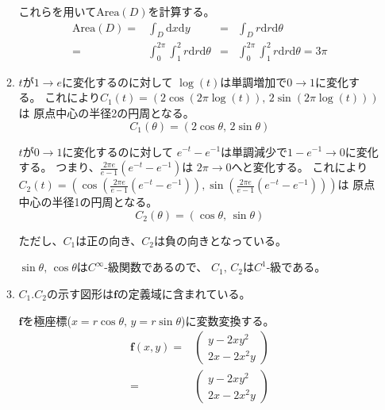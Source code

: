 \documentclass[12pt,b5paper]{ltjsarticle}
\begin{document}
\begin{enumerate}
\begin{enumerate}
            これらを用いて$\mathrm{Area}(D)$を計算する。
            \begin{align}
             \mathrm{Area}(D) =& \int_{D}\mathrm{d}x\mathrm{d}y
             &=& \int_{D}r\mathrm{d}r\mathrm{d}\theta\\
             =& \int_{0}^{2\pi}\!\!\!\int_{1}^{2} r\mathrm{d}r\mathrm{d}\theta
             &=& \int_{0}^{2\pi}\!\!\!\int_{1}^{2} r\mathrm{d}r\mathrm{d}\theta
             = 3\pi
            \end{align}


       \item
            $t$が$1 \to e$に変化するのに対して
            $\log (t)$は単調増加で$0\to 1$に変化する。
            これにより$C_1(t) = (2\cos (2\pi \log (t)) , \, 2\sin (2\pi \log (t)))$は
            原点中心の半径2の円周となる。
            \begin{equation}
             C_1(\theta) = (2\cos\theta , \, 2\sin\theta)
            \end{equation}

            $t$が$0 \to 1$に変化するのに対して
            $e^{-t}-e^{-1}$は単調減少で$1-e^{-1} \to 0$に変化する。
            つまり、$\frac{2\pi e}{e-1}(e^{-t}-e^{-1})$は
            $2\pi \to 0$へと変化する。
            これにより
            $C_2(t)=\left( \cos\left(\frac{2\pi e}{e-1}(e^{-t}-e^{-1})\right),
            \sin\left(\frac{2\pi e}{e-1}(e^{-t}-e^{-1})\right) \right)$は
            原点中心の半径1の円周となる。
            \begin{equation}
             C_2(\theta) = (\cos\theta , \, \sin\theta)
            \end{equation}

            ただし、$C_1$は正の向き、$C_2$は負の向きとなっている。

            $\sin\theta,\,\cos\theta$は$C^{\infty}$-級関数であるので、
            $C_1,\,C_2$は$C^1$-級である。

       \item
            $C_1.C_2$の示す図形は$\bm{f}$の定義域に含まれている。

            $\bm{f}$を極座標($x=r\cos\theta,\,y=r\sin\theta$)に変数変換する。
            \begin{align}
             \bm{f}(x,y) =& \begin{pmatrix}y-2xy^2\\2x-2x^2y\end{pmatrix}\\
             =& \begin{pmatrix}y-2xy^2\\2x-2x^2y\end{pmatrix}
            \end{align}



\end{enumerate}
\end{enumerate}
\end{document}
